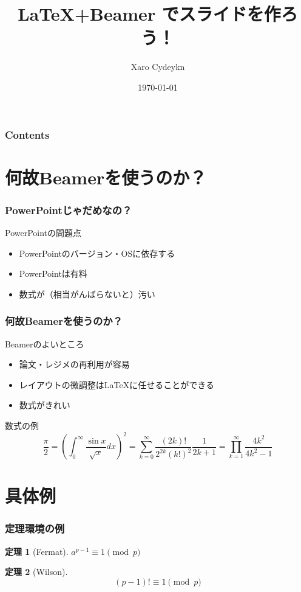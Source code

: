 \documentclass[dvipdfmx,11pt,notheorems]{beamer}
\title[略タイトル]{\LaTeX +Beamer でスライドを作ろう！}%
\author[Xaro]{Xaro Cydeykn}%
\institute[JPN]{Tokyo, Japan}%
\date{\today}%
\theoremstyle{definition}
\newtheorem{theorem}{定理}
\begin{document}
\begin{frame}[plain]\frametitle{}
\titlepage %
\end{frame}

\begin{frame}\frametitle{Contents}
\tableofcontents %
\end{frame}

\section{何故Beamerを使うのか？}
\begin{frame}\frametitle{PowerPointじゃだめなの？}
\begin{alertblock}{PowerPointの問題点}
\begin{itemize}
\item PowerPointのバージョン・OSに依存する 
\item PowerPointは有料
\item 数式が（相当がんばらないと）汚い 
\end{itemize}
\end{alertblock}
\end{frame}

\begin{frame}\frametitle{何故Beamerを使うのか？}
\begin{block}{Beamerのよいところ}
\begin{itemize}
\item 論文・レジメの再利用が容易 
\item レイアウトの微調整は\LaTeX に任せることができる 
\item 数式がきれい 
\end{itemize}
\end{block}

\begin{exampleblock}{数式の例} 
\begin{equation*}
\frac{\pi}{2} =\left( \int_{0}^{\infty} \frac{\sin x}{\sqrt{x}} dx \right)^2 =\sum_{k=0}^{\infty} \frac{(2k)!}{2^{2k}(k!)^2} \frac{1}{2k+1} 
=\prod_{k=1}^{\infty} \frac{4k^2}{4k^2 - 1}
\end{equation*}
\end{exampleblock}
\end{frame}


\section{具体例}

\begin{frame}\frametitle{定理環境の例}
\begin{theorem}[Fermat]
$a^{p-1} \equiv 1 \pmod{p}$
\end{theorem}
\pause
\begin{theorem}[Wilson]
\begin{equation}
(p-1)! \equiv 1 \pmod{p}
\end{equation}
\end{theorem}
\end{frame}
\end{document}
